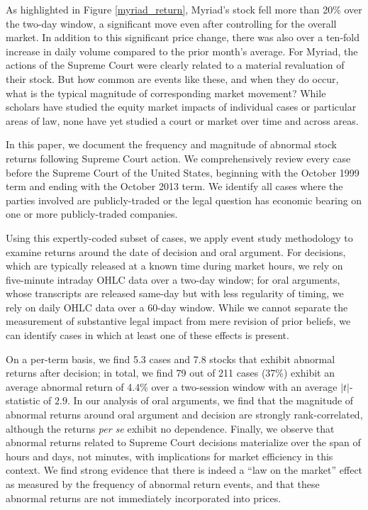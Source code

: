 \documentclass[preprint,12pt]{elsarticle}
\begin{document}
As highlighted in Figure \ref{myriad_return}, Myriad's stock fell more than 20\% over the two-day window, a significant move even after controlling for the overall market.  In addition to this significant price change, there was also over a ten-fold increase in daily volume compared to the prior month's average.  For Myriad, the actions of the Supreme Court were clearly related to a material revaluation of their stock.  But how common are events like these, and when they do occur, what is the typical magnitude of corresponding market movement?   While scholars have studied the equity market impacts of individual cases or particular areas of law, none have yet studied a court or market over time and across areas.  

In this paper, we document the frequency and magnitude of abnormal stock returns following Supreme Court action.  We comprehensively review every case before the Supreme Court of the United States, beginning with the October 1999 term and ending with the October 2013 term.  We identify all cases where the parties involved are publicly-traded or the legal question has economic bearing on one or more publicly-traded companies.  

Using this expertly-coded subset of cases, we apply event study methodology to examine returns around the date of decision and oral argument.  For decisions, which are typically released at a known time during market hours, we rely on five-minute intraday OHLC data over a two-day window; for oral arguments, whose transcripts are released same-day but with less regularity of timing, we rely on daily OHLC data over a 60-day window.  While we cannot separate the measurement of substantive legal impact from mere revision of prior beliefs, we can identify cases in which at least one of these effects is present.

On a per-term basis, we find 5.3 cases and 7.8 stocks that exhibit abnormal returns after decision; in total, we find 79 out of 211 cases (37\%) exhibit an average abnormal return of 4.4\% over a two-session window with an average $|t|$-statistic of $2.9$.  In our analysis of oral arguments, we find that the magnitude of abnormal returns around oral argument and decision are strongly rank-correlated, although the returns \textit{per se} exhibit no dependence.  Finally, we observe that abnormal returns related to Supreme Court decisions materialize over the span of hours and days, not minutes, with implications for market efficiency in this context.  We find strong evidence that there is indeed a ``law on the market'' effect as measured by the frequency of abnormal return events, and that these abnormal returns are not immediately incorporated into prices.
\end{document}
